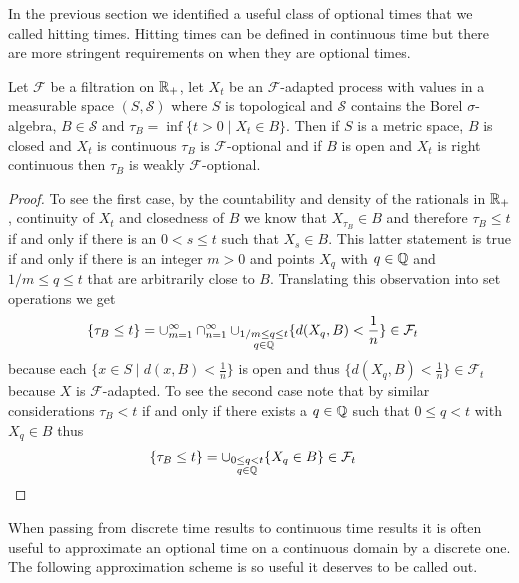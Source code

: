 In the previous section we identified a useful class of optional times
that we called hitting times.  Hitting times can be defined in
continuous time but there are more stringent requirements on when they
are optional times.
\begin{lem}\label{HittingTimesContinuous}Let $\mathcal{F}$ be a
  filtration on $\mathbb{R}_+$, let $X_t$ be an $\mathcal{F}$-adapted
  process with values in a measurable space $(S, \mathcal{S})$ where
  $S$ is topological and $\mathcal{S}$ contains the Borel $\sigma$-algebra, 
  $B \in \mathcal{S}$ and $\tau_B = \inf \lbrace t > 0 \mid X_t \in
  B\rbrace$.  Then if $S$ is a metric space, $B$ is closed and $X_t$ is continuous
$\tau_B$ is $\mathcal{F}$-optional and if $B$ is open and $X_t$ is right continuous then $\tau_B$ is weakly $\mathcal{F}$-optional.
\end{lem}
\begin{proof}
To see the first case, by the countability and density of the
rationals in $\mathbb{R}_+$, continuity of $X_t$ and closedness of $B$ we
know that $X_{\tau_B} \in B$ and therefore $\tau_B \leq t$ if and only if there is an $0 < s \leq t$
such that $X_s \in B$.  This latter statement is true if and only if there is an
integer $m>0$ and points $X_q$ with
$q \in \mathbb{Q}$ and $1/m \leq q \leq t$ that are arbitrarily close to
$B$.  Translating this observation into set operations we get
\begin{align*}
\lbrace \tau_B \leq t \rbrace &= \cup_{m=1}^\infty \cap_{n =1}^\infty \cup_{\substack{1/m
    \leq q \leq t \\ q \in \mathbb{Q}}} \lbrace d(X_q, B) < \frac{1}{n}
  \rbrace \in \mathcal{F}_t
\end{align*}
because each $\lbrace x \in S \mid d(x, B) < \frac{1}{n}  \rbrace$ is
open and thus $\lbrace d(X_q, B) < \frac{1}{n}  \rbrace \in
\mathcal{F}_t$ because $X$ is $\mathcal{F}$-adapted.
To see the second case note that by similar considerations $\tau_B < t$ if and only if there
exists a $q \in \mathbb{Q}$ such that $0 \leq q < t$ with $X_q \in B$
thus
\begin{align*}
\lbrace \tau_B \leq t \rbrace &= \cup_{\substack{0 \leq q < t \\ q \in
    \mathbb{Q}}} \lbrace X_q \in B \rbrace \in \mathcal{F}_t
\end{align*}

\end{proof}

When passing from discrete time results to continuous time results it
is often useful to approximate an optional time on a continuous domain
by a discrete one.  The following approximation scheme is so useful it
deserves to be called out.

